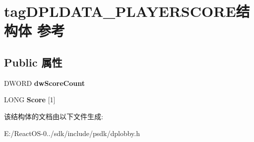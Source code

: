 \hypertarget{structtag_d_p_l_d_a_t_a___p_l_a_y_e_r_s_c_o_r_e}{}\section{tag\+D\+P\+L\+D\+A\+T\+A\+\_\+\+P\+L\+A\+Y\+E\+R\+S\+C\+O\+R\+E结构体 参考}
\label{structtag_d_p_l_d_a_t_a___p_l_a_y_e_r_s_c_o_r_e}
\subsection*{Public 属性}
\begin{DoxyCompactItemize}
\item 
\mbox{\label{structtag_d_p_l_d_a_t_a___p_l_a_y_e_r_s_c_o_r_e_adcc6fd972b8b2bae422e82e65dc2346d}} 
D\+W\+O\+RD {\bfseries dw\+Score\+Count}
\item 
\mbox{\label{structtag_d_p_l_d_a_t_a___p_l_a_y_e_r_s_c_o_r_e_a73448bfc427c44351e625f310aeda8e9}} 
L\+O\+NG {\bfseries Score} \mbox{[}1\mbox{]}
\end{DoxyCompactItemize}


该结构体的文档由以下文件生成\+:\begin{DoxyCompactItemize}
\item 
E\+:/\+React\+O\+S-\/0../sdk/include/psdk/dplobby.\+h\end{DoxyCompactItemize}
